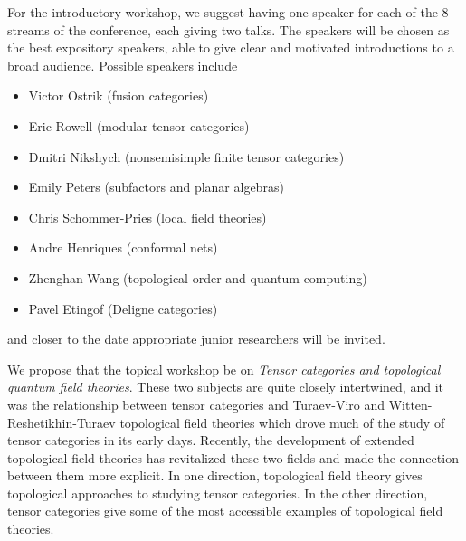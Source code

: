 \documentclass[11pt]{article}
\begin{document}

For the introductory workshop, we suggest having one speaker for each of the 8 streams of the conference, each giving two talks. The speakers will be chosen as the best expository speakers,
able to give clear and motivated introductions to a broad audience. Possible speakers include
\begin{itemize}
  \setlength{\itemsep}{1pt}
  \setlength{\parskip}{0pt}
  \setlength{\parsep}{0pt}
\item Victor Ostrik (fusion categories) 
\item Eric Rowell (modular tensor categories)
\item Dmitri Nikshych (nonsemisimple finite tensor categories) %
\item Emily Peters (subfactors and planar algebras) %
\item Chris Schommer-Pries (local field theories) %
\item Andre Henriques (conformal nets) %
\item Zhenghan Wang (topological order and quantum computing) %
\item Pavel Etingof (Deligne categories)
\end{itemize}
and closer to the date appropriate junior researchers will be invited. 

We propose that the topical workshop be on \emph{Tensor categories and topological quantum field theories}. These two subjects are quite closely intertwined, and it was the relationship between tensor categories and Turaev-Viro and Witten-Reshetikhin-Turaev topological field theories which drove much of the study of tensor categories in its early days.  Recently, the development of extended topological field theories has revitalized these two fields and made the connection between them more explicit. In one direction, topological field theory gives topological approaches to studying tensor categories. In the other direction, tensor categories give some of the most accessible examples of topological field theories.
\end{document}
